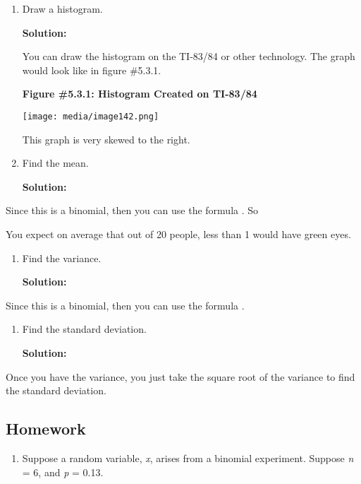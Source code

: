 \documentclass[]{book}
\providecommand{\tightlist}{%
  \setlength{\itemsep}{0pt}\setlength{\parskip}{0pt}}
\begin{document}
\begin{enumerate}
\def\labelenumi{\alph{enumi}.}
\setcounter{enumi}{2}
\item
  Draw a histogram.

  \textbf{Solution:}

  You can draw the histogram on the TI-83/84 or other technology. The
  graph would look like in figure \#5.3.1.

  \textbf{Figure \#5.3.1: Histogram Created on TI-83/84}

  \texttt{[image: media/image142.png]}

  This graph is very skewed to the right.
\item
  Find the mean.

  \textbf{Solution:}
\end{enumerate}

Since this is a binomial, then you can use the formula . So

You expect on average that out of 20 people, less than 1 would have green eyes.

\begin{enumerate}
\def\labelenumi{\alph{enumi}.}
\setcounter{enumi}{4}
\item
  Find the variance.

  \textbf{Solution:}
\end{enumerate}

Since this is a binomial, then you can use the formula .

\begin{enumerate}
\def\labelenumi{\alph{enumi}.}
\setcounter{enumi}{5}
\item
  Find the standard deviation.

  \textbf{Solution:}
\end{enumerate}

Once you have the variance, you just take the square root of the variance to find the standard deviation.

\hypertarget{homework-15}{%
\subsection{Homework}\label{homework-15}}

\begin{enumerate}
\def\labelenumi{\arabic{enumi}.}
\tightlist
\item
  Suppose a random variable, \emph{x}, arises from a binomial experiment. Suppose \emph{n} = 6, and \emph{p} = 0.13.
\end{enumerate}
\end{document}
